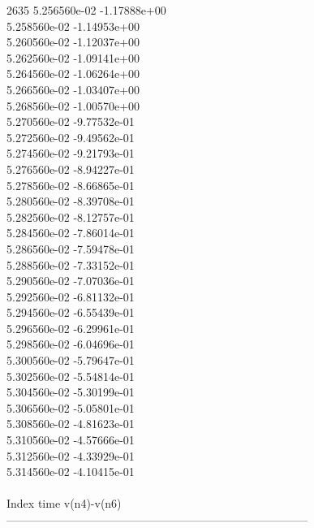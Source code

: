 2635	5.256560e-02	-1.17888e+00	\\ 	5.258560e-02	-1.14953e+00	\\ 	5.260560e-02	-1.12037e+00	\\ 	5.262560e-02	-1.09141e+00	\\ 	5.264560e-02	-1.06264e+00	\\ 	5.266560e-02	-1.03407e+00	\\ 	5.268560e-02	-1.00570e+00	\\ 	5.270560e-02	-9.77532e-01	\\ 	5.272560e-02	-9.49562e-01	\\ 	5.274560e-02	-9.21793e-01	\\ 	5.276560e-02	-8.94227e-01	\\ 	5.278560e-02	-8.66865e-01	\\ 	5.280560e-02	-8.39708e-01	\\ 	5.282560e-02	-8.12757e-01	\\ 	5.284560e-02	-7.86014e-01	\\ 	5.286560e-02	-7.59478e-01	\\ 	5.288560e-02	-7.33152e-01	\\ 	5.290560e-02	-7.07036e-01	\\ 	5.292560e-02	-6.81132e-01	\\ 	5.294560e-02	-6.55439e-01	\\ 	5.296560e-02	-6.29961e-01	\\ 	5.298560e-02	-6.04696e-01	\\ 	5.300560e-02	-5.79647e-01	\\ 	5.302560e-02	-5.54814e-01	\\ 	5.304560e-02	-5.30199e-01	\\ 	5.306560e-02	-5.05801e-01	\\ 	5.308560e-02	-4.81623e-01	\\ 	5.310560e-02	-4.57666e-01	\\ 	5.312560e-02	-4.33929e-01	\\ 	5.314560e-02	-4.10415e-01	\\ \hline
\\ \hline
Index   time            v(n4)-v(n6)     \\ \hline
--------------------------------------------------------------------------------\\ \hline
